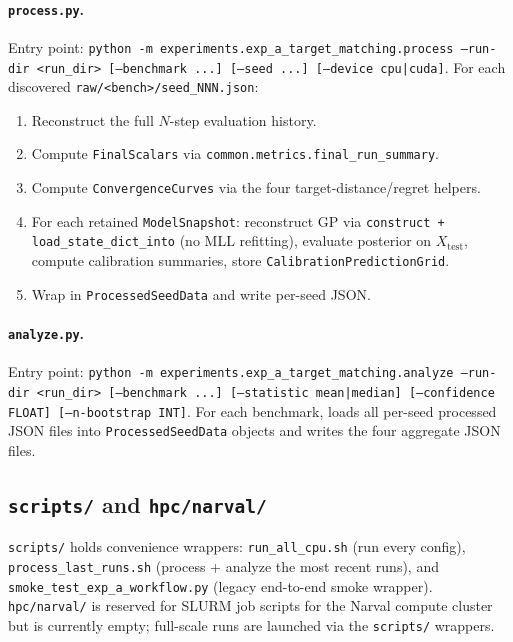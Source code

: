 \documentclass[11pt]{article}
\begin{document}
\paragraph{\texttt{process.py}.}
Entry point:
\texttt{python -m experiments.exp\_a\_target\_matching.process
  --run-dir <run\_dir> [--benchmark ...] [--seed ...] [--device cpu|cuda]}.
For each discovered \texttt{raw/<bench>/seed\_NNN.json}:
\begin{enumerate}
  \item Reconstruct the full $N$-step evaluation history.
  \item Compute \texttt{FinalScalars} via \texttt{common.metrics.final\_run\_summary}.
  \item Compute \texttt{ConvergenceCurves} via the four target-distance/regret helpers.
  \item For each retained \texttt{ModelSnapshot}: reconstruct GP via
        \texttt{construct + load\_state\_dict\_into} (no MLL refitting),
        evaluate posterior on $X_{\mathrm{test}}$, compute calibration summaries,
        store \texttt{CalibrationPredictionGrid}.
  \item Wrap in \texttt{ProcessedSeedData} and write per-seed JSON.
\end{enumerate}
 
\paragraph{\texttt{analyze.py}.}
Entry point:
\texttt{python -m experiments.exp\_a\_target\_matching.analyze
  --run-dir <run\_dir> [--benchmark ...] [--statistic mean|median]
  [--confidence FLOAT] [--n-bootstrap INT]}.
For each benchmark, loads all per-seed processed JSON files into
\texttt{ProcessedSeedData} objects and writes the four aggregate JSON files.
 
\subsection{\texttt{scripts/} and \texttt{hpc/narval/}}

\texttt{scripts/} holds convenience wrappers: \texttt{run\_all\_cpu.sh} (run every
config), \texttt{process\_last\_runs.sh} (process + analyze the most recent runs),
and \texttt{smoke\_test\_exp\_a\_workflow.py} (legacy end-to-end smoke wrapper).
\texttt{hpc/narval/} is reserved for SLURM job scripts for the Narval compute
cluster but is currently empty; full-scale runs are launched via the
\texttt{scripts/} wrappers.
 
\end{document}
